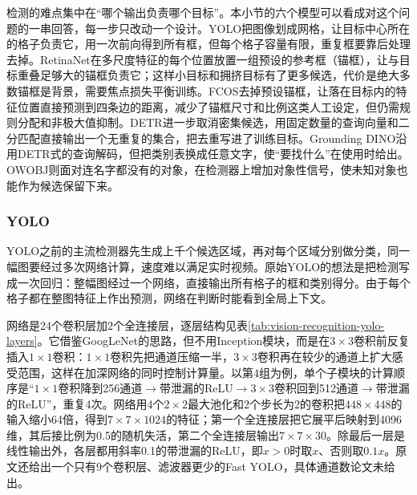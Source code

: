 检测的难点集中在“哪个输出负责哪个目标”。本小节的六个模型可以看成对这个问题的一串回答，每一步只改动一个设计。YOLO把图像划成网格，让目标中心所在的格子负责它，用一次前向得到所有框，但每个格子容量有限，重复框要靠后处理去掉。RetinaNet在多尺度特征的每个位置放置一组预设的参考框（锚框），让与目标重叠足够大的锚框负责它；这样小目标和拥挤目标有了更多候选，代价是绝大多数锚框是背景，需要焦点损失平衡训练。FCOS去掉预设锚框，让落在目标内的特征位置直接预测到四条边的距离，减少了锚框尺寸和比例这类人工设定，但仍需规则分配和非极大值抑制。DETR进一步取消密集候选，用固定数量的查询向量和二分匹配直接输出一个无重复的集合，把去重写进了训练目标。Grounding DINO沿用DETR式的查询解码，但把类别表换成任意文字，使“要找什么”在使用时给出。OWOBJ则面对连名字都没有的对象，在检测器上增加对象性信号，使未知对象也能作为候选保留下来。

\subsubsection{YOLO}
\label{sec:vision-recognition-yolo}

YOLO之前的主流检测器先生成上千个候选区域，再对每个区域分别做分类，同一幅图要经过多次网络计算，速度难以满足实时视频。原始YOLO的想法是把检测写成一次回归：整幅图经过一个网络，直接输出所有格子的框和类别得分。由于每个格子都在整图特征上作出预测，网络在判断时能看到全局上下文。

网络是24个卷积层加2个全连接层，逐层结构见表\ref{tab:vision-recognition-yolo-layers}。它借鉴GoogLeNet的思路，但不用Inception模块，而是在$3\times3$卷积前反复插入$1\times1$卷积：$1\times1$卷积先把通道压缩一半，$3\times3$卷积再在较少的通道上扩大感受范围，这样在加深网络的同时控制计算量。以第4组为例，单个子模块的计算顺序是“$1\times1$卷积降到256通道$\to$带泄漏的ReLU$\to3\times3$卷积回到512通道$\to$带泄漏的ReLU”，重复4次。网络用4个$2\times2$最大池化和2个步长为2的卷积把$448\times448$的输入缩小64倍，得到$7\times7\times1024$的特征；第一个全连接层把它展平后映射到4096维，其后接比例为0.5的随机失活，第二个全连接层输出$7\times7\times30$。除最后一层是线性输出外，各层都用斜率0.1的带泄漏的ReLU，即$x>0$时取$x$、否则取$0.1x$。原文还给出一个只有9个卷积层、滤波器更少的Fast YOLO，具体通道数论文未给出。

